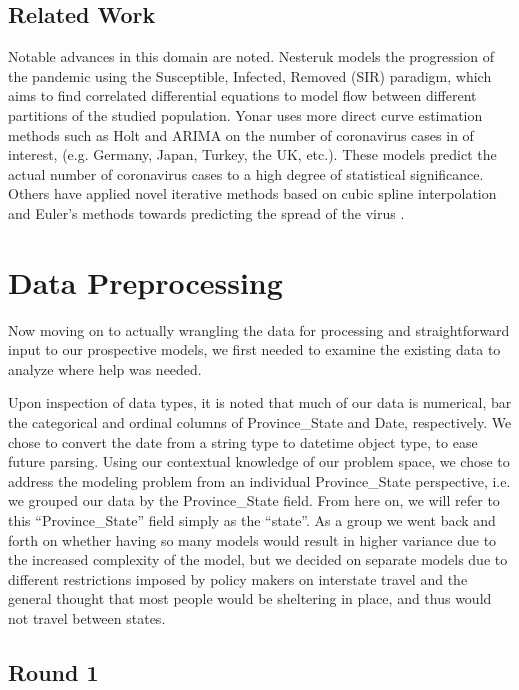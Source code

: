 \documentclass[sigconf,nonacm]{acmart}
\begin{document}
\subsection{Related Work}
Notable advances in this domain are noted. Nesteruk \cite{Nesteruk} models the
progression of the pandemic using the Susceptible, Infected, Removed (SIR)
paradigm, which aims to find correlated differential equations to model flow
between different partitions of the studied population. 
Yonar \cite{EJMO} uses more direct curve estimation methods such as Holt and ARIMA on
the number of coronavirus cases in of interest, (e.g. Germany, Japan, Turkey,
the UK, etc.). These models predict the actual number of coronavirus cases to a
high degree of statistical significance. 
Others have applied novel iterative methods based on cubic spline interpolation
and Euler's methods towards predicting the spread of the virus \cite{APPADU2020}.


\section{Data Preprocessing}

Now moving on to actually wrangling the data for processing and straightforward
input to our prospective models, we first needed to examine the existing data
to analyze where help was needed. 

Upon inspection of data types, it is noted
that much of our data is numerical, bar the categorical and ordinal columns of
Province\_State and Date, respectively. We chose to convert the date from a
string type to datetime object type, to ease future parsing. Using our
contextual knowledge of our problem space, we chose to address the modeling
problem from an individual Province\_State perspective, i.e. we grouped our
data by the Province\_State field. From here on, we will refer to this
“Province\_State” field simply as the “state”. As a group we went back and
forth on whether having so many models would result in higher variance due to
the increased complexity of the model, but we decided on separate models due to
different restrictions imposed by policy makers on interstate travel and the
general thought that most people would be sheltering in place, and thus would
not travel between states.

\subsection{Round 1}
\end{document}
